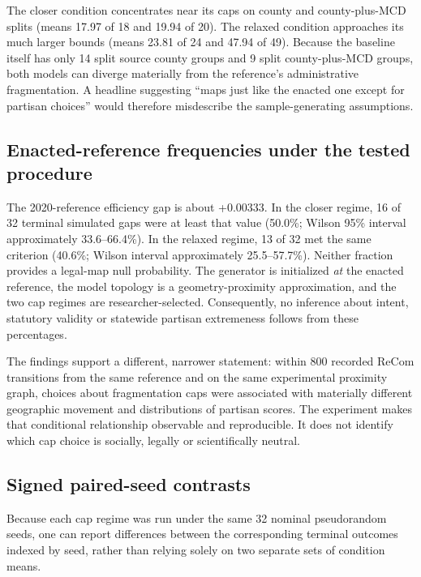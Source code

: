 \documentclass[
  10pt,
]{article}
\begin{document}
The closer condition concentrates near its caps on county and
county-plus-MCD splits (means 17.97 of 18 and 19.94 of 20). The relaxed
condition approaches its much larger bounds (means 23.81 of 24 and 47.94
of 49). Because the baseline itself has only 14 split source county
groups and 9 split county-plus-MCD groups, both models can diverge
materially from the reference's administrative fragmentation. A headline
suggesting ``maps just like the enacted one except for partisan
choices'' would therefore misdescribe the sample-generating assumptions.

\hypertarget{enacted-reference-frequencies-under-the-tested-procedure}{%
\subsection{Enacted-reference frequencies under the tested
procedure}\label{enacted-reference-frequencies-under-the-tested-procedure}}

The 2020-reference efficiency gap is about +0.00333. In the closer
regime, 16 of 32 terminal simulated gaps were at least that value
(50.0\%; Wilson 95\% interval approximately 33.6--66.4\%). In the
relaxed regime, 13 of 32 met the same criterion (40.6\%; Wilson interval
approximately 25.5--57.7\%). Neither fraction provides a legal-map null
probability. The generator is initialized \emph{at} the enacted
reference, the model topology is a geometry-proximity approximation, and
the two cap regimes are researcher-selected. Consequently, no inference
about intent, statutory validity or statewide partisan extremeness
follows from these percentages.

The findings support a different, narrower statement: within 800
recorded ReCom transitions from the same reference and on the same
experimental proximity graph, choices about fragmentation caps were
associated with materially different geographic movement and
distributions of partisan scores. The experiment makes that conditional
relationship observable and reproducible. It does not identify which cap
choice is socially, legally or scientifically neutral.

\hypertarget{signed-paired-seed-contrasts}{%
\subsection{Signed paired-seed
contrasts}\label{signed-paired-seed-contrasts}}

Because each cap regime was run under the same 32 nominal pseudorandom
seeds, one can report differences between the corresponding terminal
outcomes indexed by seed, rather than relying solely on two separate
sets of condition means.
\end{document}
